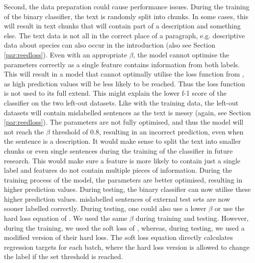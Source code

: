 \documentclass[a4paper, 12pt, oneside]{book} %
\begin{document}
Second, the data preparation could cause performance issues.
During the training of the binary classifier, the text is randomly split into chunks. 
In some cases, this will result in text chunks that will contain part of a description and something else.
The text data is not all in the correct place of a paragraph, e.g. descriptive data about species can also occur in the introduction (also see Section \ref{par:reedloss}).
Even with an appropriate \(\beta\), the model cannot optimise the parameters correctly as a single feature contains information from both labels.
This will result in a model that cannot optimally utilise the loss function from \textcite{reed_training_2015}, as high prediction values will be less likely to be reached.
Thus the loss function is not used to its full extend.
This might explain the lower f-1 score of the classifier on the two left-out datasets.
Like with the training data, the left-out datasets will contain mislabelled sentences as the text is messy (again, see Section \ref{par:reedloss}).
The parameters are not fully optimised, and thus the model will not reach the \(\beta\) threshold of 0.8, resulting in an incorrect prediction, even when the sentence is a description.
It would make sense to split the text into smaller chunks or even single sentences during the training of the classifier in future research.
This would make sure a feature is more likely to contain just a single label and features do not contain multiple pieces of information.
During the training process of the model, the parameters are better optimised, resulting in higher prediction values.
During testing, the binary classifier can now utilise these higher prediction values.
mislabelled sentences of external test sets are now sooner labelled correctly.
During testing, one could also use a lower \(\beta\) or use the hard loss equation of \textcite{reed_training_2015}.
We used the same \(\beta\) during training and testing.
However, during the training, we used the soft loss of \textcite{reed_training_2015}, whereas, during testing, we used a modified version of their hard loss.
The soft loss equation directly calculates regression targets for each batch, where the hard loss version is allowed to change the label if the set threshold is reached.
\end{document}
